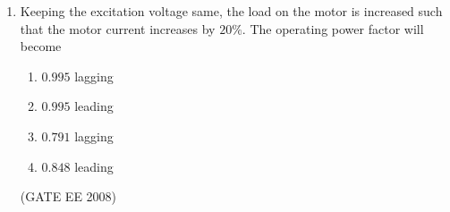 \documentclass[journal,12pt,onecolumn]{IEEEtran}
\theoremstyle{remark}
\begin{document}
\begin{enumerate}[start=1, label=Q.\arabic*]
\item  Keeping the excitation voltage same, the load on the motor is increased such that the motor current increases by $20\%$. The operating power factor will become

\begin{multicols}{2}
\begin{enumerate}
  \item $0.995$ lagging
  \item $0.995$ leading
  \item $0.791$ lagging
  \item $0.848$ leading
\end{enumerate}
\end{multicols}
\hfill (GATE EE 2008) \\[5mm]





\end{enumerate}
    
\end{document}
